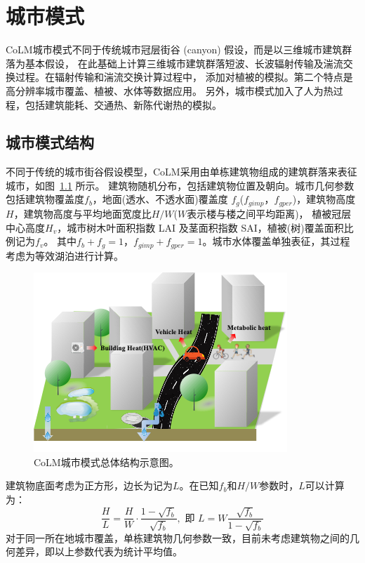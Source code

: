 \chapter{城市模式}\label{城市模式}
CoLM城市模式不同于传统城市冠层街谷 (canyon) 假设，而是以三维城市建筑群落为基本假设，
在此基础上计算三维城市建筑群落短波、长波辐射传输及湍流交换过程。在辐射传输和湍流交换计算过程中，
添加对植被的模拟。第二个特点是高分辨率城市覆盖、植被、水体等数据应用。
另外，城市模式加入了人为热过程，包括建筑能耗、交通热、新陈代谢热的模拟。


\section{城市模式结构}
不同于传统的城市街谷假设模型，CoLM采用由单栋建筑物组成的建筑群落来表征城市，如图~\ref{fig:CoLM城市模式总体结构示意图} 所示。
建筑物随机分布，包括建筑物位置及朝向。城市几何参数包括建筑物覆盖度$f_b$，地面(透水、不透水面)覆盖度
$f_g$($f_{gimp}$，$f_{gper}$)，建筑物高度$H$，建筑物高度与平均地面宽度比$H/W$($W$表示楼与楼之间平均距离)，
植被冠层中心高度$H_v$，城市树木叶面积指数 LAI 及茎面积指数 SAI，植被(树)覆盖面积比例记为$f_v$。
其中$f_b+f_g=1$，$f_{gimp}+f_{gper}=1$。城市水体覆盖单独表征，其过程考虑为等效湖泊进行计算。

{
\begin{figure}[htbp]
\centering
\includegraphics{Figures/城市模式/CoLM城市模式总体结构示意图.png}
\caption{CoLM城市模式总体结构示意图。}
\label{fig:CoLM城市模式总体结构示意图}
\end{figure}
}

建筑物底面考虑为正方形，边长为记为$L$。在已知$f_b$和$H/W$参数时，$L$可以计算为：
\begin{equation}
\frac{H}{L}=\frac{H}{W} \cdot \frac{1-\sqrt{f_{b}}}{\sqrt{f_{b}}}, \text { 即 } L=W \frac{\sqrt{f_{b}}}{1-\sqrt{f_{b}}}
\end{equation}
对于同一所在地城市覆盖，单栋建筑物几何参数一致，目前未考虑建筑物之间的几何差异，即以上参数代表为统计平均值。

